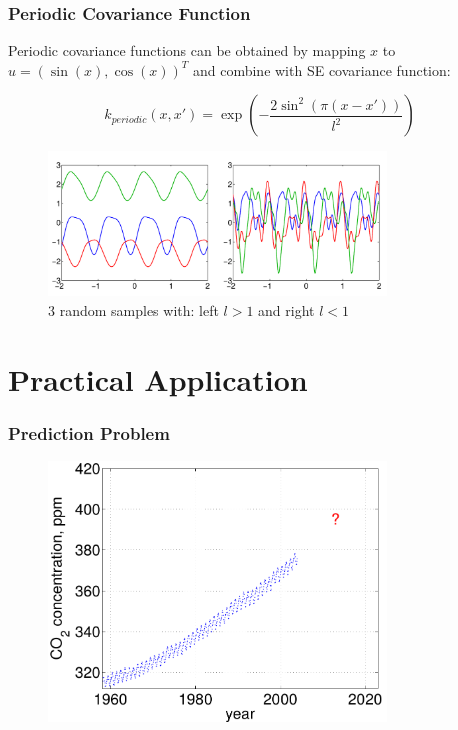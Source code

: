 \documentclass[10pt]{beamer}
\begin{document}
  \begin{frame}
    \frametitle{Periodic Covariance Function}
    Periodic covariance functions can be obtained by mapping $x$ to $u = (\sin(x), \cos(x))^T$ and combine with SE covariance function:

    \begin{equation*}
      k_{periodic} (x,x') = \exp \left( - \frac{2 \sin^2(\pi (x - x'))}{l^2} \right)
    \end{equation*}

    \begin{figure}
      \centering
      \includegraphics[width=0.8\textwidth]{periodicCovFunc.png}
      \caption*{3 random samples with: left $l > 1$ and right $l < 1$}
    \end{figure}
  \end{frame}

  \section{Practical Application}

  \begin{frame}
    \frametitle{Prediction Problem}

    \begin{figure}
      \centering
      \includegraphics[width=0.8\textwidth]{prediction1.png}
    \end{figure}
  \end{frame}
\end{document}
